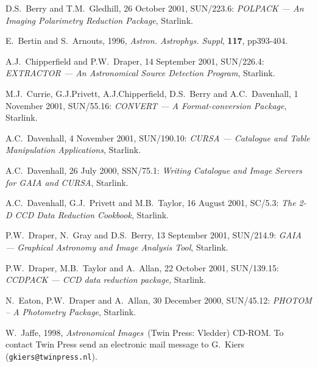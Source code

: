 \documentclass[twoside,11pt]{article}
\newenvironment{latexonly}{}{}
\newcommand{\xref}[3]{#1}
\renewcommand{\_}{\texttt{\symbol{95}}}
\begin{document}
% 
\newpage
{}
\begin{thebibliography}{99}

   D.S.~Berry and T.M.~Gledhill, 26 October 2001,
   \xref{SUN/223.6}{sun223}{}: {\it POLPACK --- An Imaging Polarimetry
   Reduction Package}, Starlink.

   E.~Bertin and S.~Arnouts, 1996, {\it Astron.
   Astrophys. Suppl}, {\bf 117}, pp393-404.

   A.J.~Chipperfield and P.W.~Draper, 14 September 2001,
   \xref{SUN/226.4}{sun226}{}: {\it EXTRACTOR --- An Astronomical Source
   Detection Program}, Starlink.

   M.J.~Currie, G.J.Privett, A.J.Chipperfield,
   D.S.~Berry and A.C.~Davenhall, 1 November 2001,
   \xref{SUN/55.16}{sun55}{}: {\it CONVERT --- A Format-conversion
   Package}, Starlink.

   A.C.~Davenhall, 4 November 2001,
   \xref{SUN/190.10}{sun190}{}: {\it CURSA --- Catalogue and Table
   Manipulation Applications}, Starlink.

   A.C.~Davenhall, 26 July 2000,
   \xref{SSN/75.1}{ssn75}{}: {\it Writing Catalogue and Image Servers for
   GAIA and CURSA}, Starlink.

   A.C.~Davenhall, G.J.~Privett and M.B.~Taylor, 16 August 2001,
   \xref{SC/5.3}{sc5}{}: {\it The 2-D CCD Data Reduction Cookbook},
   Starlink.

   P.W.~Draper, N.~Gray and D.S.~Berry, 13 September 2001,
   \xref{SUN/214.9}{sun214}{}: {\it GAIA --- Graphical Astronomy and
   Image Analysis Tool}, Starlink.

   P.W.~Draper, M.B.~Taylor and A.~Allan, 22 October 2001,
   \xref{SUN/139.15}{sun139}{}: {\it CCDPACK --- CCD data reduction
   package}, Starlink.

   N.~Eaton, P.W.~Draper and A.~Allan, 30 December 2000,
   \xref{SUN/45.12}{sun45}{}: {\it PHOTOM -- A Photometry Package},
   Starlink.

   W.~Jaffe, 1998, {\it Astronomical Images}\,
   (Twin Press: Vledder) CD-ROM.  To contact Twin Press send an electronic
   mail message to G.~Kiers ({\tt gkiers@twinpress.nl}).


\end{thebibliography}
\end{document}
